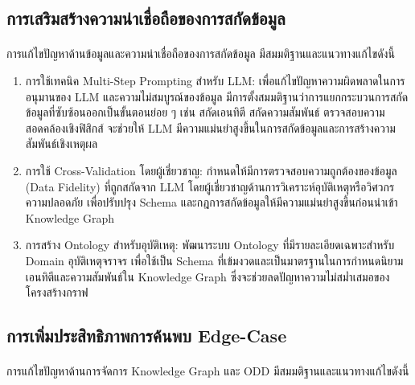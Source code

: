 \subsection{การเสริมสร้างความน่าเชื่อถือของการสกัดข้อมูล}\label{subsec:improving-data-reliability}

\paragraph{} การแก้ไขปัญหาด้านข้อมูลและความน่าเชื่อถือของการสกัดข้อมูล มีสมมติฐานและแนวทางแก้ไขดังนี้

\begin{enumerate}[label=\arabic*.)]
    \item การใช้เทคนิค Multi-Step Prompting สำหรับ LLM: เพื่อแก้ไขปัญหาความผิดพลาดในการอนุมานของ LLM และความไม่สมบูรณ์ของข้อมูล มีการตั้งสมมติฐานว่าการแยกกระบวนการสกัดข้อมูลที่ซับซ้อนออกเป็นขั้นตอนย่อย ๆ เช่น สกัดเอนทิตี สกัดความสัมพันธ์ ตรวจสอบความสอดคล้องเชิงฟิสิกส์ จะช่วยให้ LLM มีความแม่นยำสูงขึ้นในการสกัดข้อมูลและการสร้างความสัมพันธ์เชิงเหตุผล
    \item การใช้ Cross-Validation โดยผู้เชี่ยวชาญ: กำหนดให้มีการตรวจสอบความถูกต้องของข้อมูล (Data Fidelity) ที่ถูกสกัดจาก LLM โดยผู้เชี่ยวชาญด้านการวิเคราะห์อุบัติเหตุหรือวิศวกรความปลอดภัย เพื่อปรับปรุง Schema และกฎการสกัดข้อมูลให้มีความแม่นยำสูงขึ้นก่อนนำเข้า Knowledge Graph
    \item การสร้าง Ontology สำหรับอุบัติเหตุ: พัฒนาระบบ Ontology ที่มีรายละเอียดเฉพาะสำหรับ Domain อุบัติเหตุจราจร เพื่อใช้เป็น Schema ที่เข้มงวดและเป็นมาตรฐานในการกำหนดนิยามเอนทิตีและความสัมพันธ์ใน Knowledge Graph ซึ่งจะช่วยลดปัญหาความไม่สม่ำเสมอของโครงสร้างกราฟ
\end{enumerate}

\subsection{การเพิ่มประสิทธิภาพการค้นพบ Edge-Case}\label{subsec:improving-edge-case-discovery}

\paragraph{} การแก้ไขปัญหาด้านการจัดการ Knowledge Graph และ ODD มีสมมติฐานและแนวทางแก้ไขดังนี้

